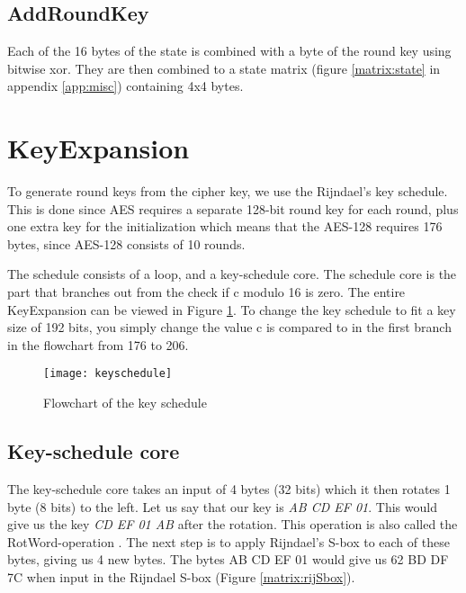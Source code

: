 
\subsection{AddRoundKey}
Each of the 16 bytes of the state is combined with a byte of the round key 
using bitwise xor. They are then combined to a state matrix (figure 
\ref{matrix:state} in appendix \ref{app:misc}) containing 4x4 bytes.

\section{KeyExpansion}\label{sec:KeySch}
To generate round keys from the cipher key, we use the Rijndael's key schedule. 
This is done since AES requires a separate 128-bit round key for each round, 
plus one extra key for the initialization which means that the AES-128 requires 
176 bytes, since AES-128 consists of 10 rounds. 


The schedule consists of a loop, and a key-schedule core. The schedule core is 
the part that branches out from the check if c modulo 16 is zero. The entire 
KeyExpansion can be viewed in Figure \ref{img:keysch}. To change the key schedule
to fit a key size of 192 bits, you simply change the value c is compared to in 
the first branch in the flowchart from 176 to 206. 

\begin{figure}
  \texttt{[image: keyschedule]}
  \caption{Flowchart of the key schedule}
  \label{img:keysch}
\end{figure}

\subsection{Key-schedule core}\label{sec:kCore}
The key-schedule core takes an input of 4 bytes (32 bits) which it then rotates 
1 byte (8 bits) to the left. Let us say that our key is \emph{AB CD EF 01}. This 
would give us the key \emph{CD EF 01 AB} after the rotation. This operation is 
also called the RotWord-operation \citep[p. 107]{Stinson:2006}. The next step is 
to apply Rijndael's S-box to each of these bytes, giving us 4 new bytes. The 
bytes {AB CD EF 01} would give us {62 BD DF 7C} when input in the Rijndael 
S-box (Figure \ref{matrix:rijSbox}).

